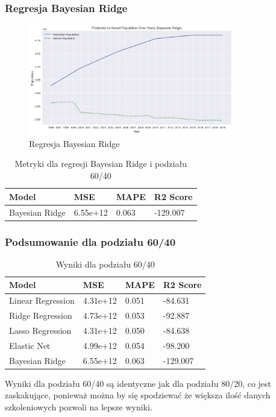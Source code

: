 \documentclass[11pt]{article}
\begin{document}
\subsubsection*{Regresja Bayesian Ridge}
\begin{figure}[H]
        \centering
        \includegraphics[width=0.8\textwidth]{images/bayesian_ridge996.png}
        \caption{Regresja Bayesian Ridge}
\end{figure}
\begin{table}[H]
        \centering
        \begin{tabular}{|l|l|l|l|}
        \hline
        Model & MSE & MAPE & R2 Score \\ \hline
        Bayesian Ridge & 6.55e+12 & 0.063 & -129.007 \\ \hline
        \end{tabular}
        \caption{Metryki dla regresji Bayesian Ridge i podziału 60/40}
\end{table}
\subsubsection*{Podsumowanie dla podziału 60/40}
\begin{table}[H]
        \centering
        \begin{tabular}{|l|l|l|l|}
        \hline
        Model & MSE & MAPE & R2 Score \\ \hline
        Linear Regression & 4.31e+12 & 0.051 & -84.631 \\ \hline
        Ridge Regression & 4.73e+12 & 0.053 & -92.887 \\ \hline
        Lasso Regression & 4.31e+12 & 0.050 & -84.638 \\ \hline
        Elastic Net & 4.99e+12 & 0.054 & -98.200 \\ \hline
        Bayesian Ridge & 6.55e+12 & 0.063 & -129.007 \\ \hline
        \end{tabular}
        \caption{Wyniki dla podziału 60/40}
        \end{table}
Wyniki dla podziału 60/40 są identyczne jak dla podziału 80/20, co jest zaskakujące, ponieważ można by się spodziewać że większa ilość danych szkoleniowych pozwoli na lepsze wyniki.


\end{document}
